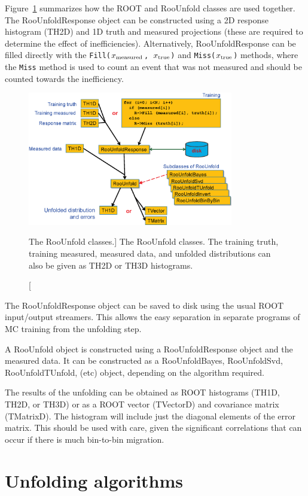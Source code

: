 \documentclass{cernrep}
\begin{document}
Figure~\ref{Fig:adye:classes} summarizes how the ROOT and RooUnfold classes are used
together. The RooUnfoldResponse object can be constructed using a 2D response histogram (TH2D)
and 1D truth and measured projections (these are required to determine the effect of inefficiencies).
Alternatively, RooUnfoldResponse can be filled directly with the
\texttt{Fill($x_{\rm measured}$, $x_{\rm true}$)}
and
\texttt{Miss($x_{\rm true}$)}
methods, where the \texttt{Miss} method is used to count an event that was not measured
and should be counted towards the inefficiency.%
\begin{figure}
\centerline{\includegraphics[width=0.8\textwidth]{phystat2011_adye_classes.eps}}
\caption
[The RooUnfold classes.]%
{The RooUnfold classes. The training truth, training measured, measured data, and unfolded distributions
can also be given as TH2D or TH3D histograms.}%
\label{Fig:adye:classes}%
\end{figure}

The RooUnfoldResponse object can be saved to disk using the usual ROOT input/output
streamers. This allows the easy separation in separate programs
of MC training from the unfolding step.

A RooUnfold object is constructed using a RooUnfoldResponse object and the measured
data. It can be constructed as a RooUnfoldBayes, RooUnfoldSvd, RooUnfoldTUnfold, (etc)
object, depending on the algorithm required.

The results of the unfolding can be obtained as ROOT histograms (TH1D, TH2D, or TH3D)
or as a ROOT vector (TVectorD) and covariance matrix (TMatrixD). The histogram will
include just the diagonal elements of the error matrix. This should be used with care,
given the significant correlations that can occur if there is much bin-to-bin migration.

\section{Unfolding algorithms}
\end{document}

